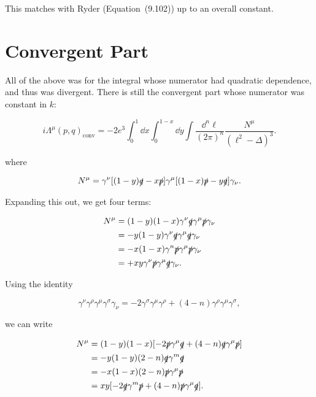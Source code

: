 \documentclass[titlepage]{article}
\begin{document}
This matches with Ryder (Equation~(9.102)) up to an overall constant.



\section{Convergent Part}

All of the above was for the integral whose numerator had quadratic dependence, and thus was divergent. There is still the convergent part whose numerator was constant in $k$:

\begin{equation}
  i\Lambda^\mu(p,q)_{\mathrm{conv}} = -2e^3 \int_0^1 \dd x \int_0^{1-x} \dd y \int \frac{\dd^n\ell}{(2\pi)^n} \frac{N^\mu}{(\ell^2 - \Delta)^3}.
\end{equation}

where

\begin{equation}
  N^\mu  = \gamma^\nu[(1-y)\slashed{q} - x\slashed{p}]\gamma^\mu[(1-x)\slashed{p} - y\slashed{q}]\gamma_\nu.
\end{equation}

Expanding this out, we get four terms:

\begin{align}
  N^\mu &= (1-y)(1-x) \gamma^\nu\slashed{q}\gamma^\mu\slashed{p}\gamma_\nu \\
        &= -y(1-y) \gamma^\nu\slashed{q}\gamma^\mu\slashed{q}\gamma_\nu \\
        &= -x(1-x) \gamma^n\slashed{p}\gamma^\mu\slashed{p}\gamma_\nu \\
  &= + xy\gamma^\nu\slashed{p}\gamma^\mu\slashed{q}\gamma_\nu.
\end{align}

Using the identity

\begin{equation}
  \gamma^\nu\gamma^\rho\gamma^\mu\gamma^\sigma\gamma_\nu = -2\gamma^\sigma\gamma^\mu\gamma^\rho + (4-n)\gamma^\rho\gamma^\mu\gamma^\sigma,
\end{equation}

we can write

\begin{align}
  N^\mu &= (1-y)(1-x)[-2\slashed{p}\gamma^\mu\slashed{q} + (4-n)\slashed{q}\gamma^\mu\slashed{p}] \\
        &= - y(1-y)(2-n)\slashed{q}\gamma^m\slashed{q} \\
        &= -x(1-x)(2-n)\slashed{p}\gamma^\mu\slashed{p} \\
  &= xy[-2 \slashed{q}\gamma^m\slashed{p} + (4-n)\slashed{p}\gamma^\mu\slashed{q}].
\end{align}
\end{document}
